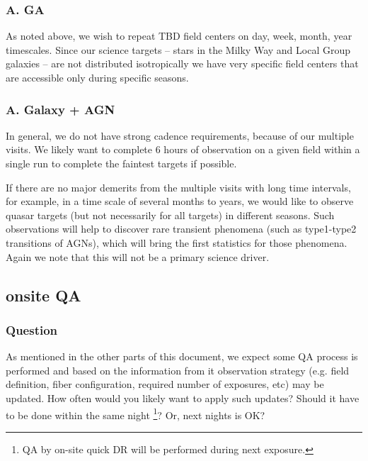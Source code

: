 \documentclass[a4paper,notitlepage]{article}
\begin{document}
\subsubsection{A. GA}
As noted above, we wish to repeat TBD field centers on day, week,
month, year timescales.  Since our science targets -- stars in the
Milky Way and Local Group galaxies -- are not distributed
isotropically we have very specific field centers that are accessible
only during specific seasons.

\subsubsection{A. Galaxy + AGN}

In general, we do not have strong cadence requirements, because of our 
multiple visits.  We likely want to complete 6 hours of observation 
on a given field within a single run to complete the faintest targets 
if possible.

If there are no major demerits from the multiple visits with long 
time intervals, for example, in a time scale of several months to 
years, we would like to observe quasar targets (but not necessarily 
for all targets) in different seasons. Such observations will help 
to discover rare transient phenomena (such as type1-type2 transitions 
of AGNs), which will bring the first statistics for those phenomena. 
Again we note that this will not be a primary science driver.


\subsection{onsite QA}

\subsubsection{Question}
As mentioned in the other parts of this document, we
           expect some QA process is performed and based on the
           information from it observation strategy (e.g. field
           definition, fiber configuration, required number of
           exposures, etc) may be updated. How often would you
           likely want to apply such updates? Should it have to be done
           within the same night \footnote{QA by on-site quick DR will
       be performed during next exposure.}? Or, next nights is OK?
\end{document}
